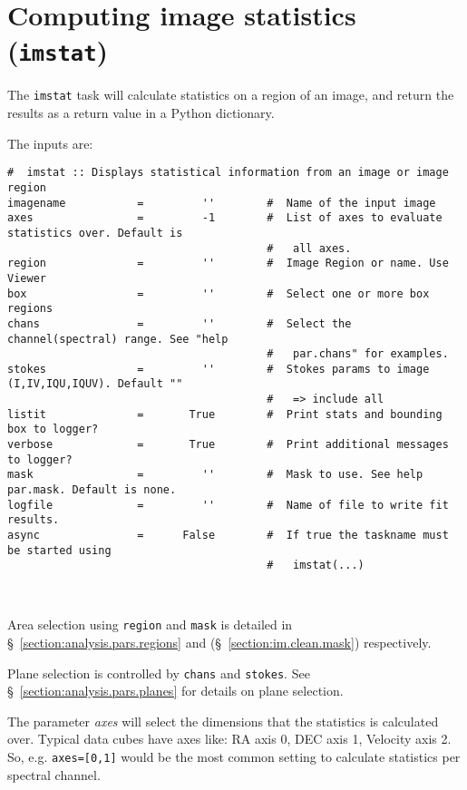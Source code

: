 \section{Computing image statistics ({\tt imstat})}
\label{section:analysis.imstat}

The {\tt imstat} task will calculate statistics on a region of
an image, and return the results as a return value in a Python
dictionary.

The inputs are:
\small
\begin{verbatim}
#  imstat :: Displays statistical information from an image or image region
imagename           =         ''        #  Name of the input image
axes                =         -1        #  List of axes to evaluate statistics over. Default is
                                        #   all axes.
region              =         ''        #  Image Region or name. Use Viewer
box                 =         ''        #  Select one or more box regions
chans               =         ''        #  Select the channel(spectral) range. See "help
                                        #   par.chans" for examples.
stokes              =         ''        #  Stokes params to image (I,IV,IQU,IQUV). Default ""
                                        #   => include all
listit              =       True        #  Print stats and bounding box to logger?
verbose             =       True        #  Print additional messages to logger?
mask                =         ''        #  Mask to use. See help par.mask. Default is none.
logfile             =         ''        #  Name of file to write fit results.
async               =      False        #  If true the taskname must be started using
                                        #   imstat(...)

              
\end{verbatim}
\normalsize

Area selection using {\tt region} and {\tt mask} is detailed in 
\S~\ref{section:analysis.pars.regions} and
(\S~\ref{section:im.clean.mask}) respectively.

Plane selection is controlled by {\tt chans} and {\tt stokes}.
See \S~\ref{section:analysis.pars.planes} for details on plane
selection.

The parameter {\it axes} will select the dimensions that the
statistics is calculated over. Typical data cubes have axes like: RA
axis 0, DEC axis 1, Velocity axis 2. So, e.g. {\tt axes=[0,1]} would
be the most common setting to calculate statistics per spectral
channel.

